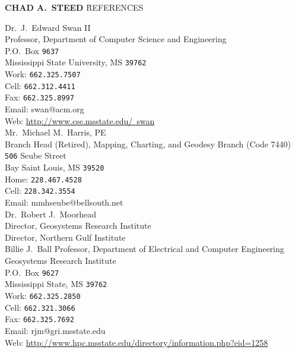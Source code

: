 \documentclass[11pt, a4paper]{article}
\begin{document}

\begin{tabbing}
    {\sffamily \LARGE \textbf{CHAD A.\ STEED}} \` {\sffamily \LARGE REFERENCES}
\end{tabbing}

Dr.~J.~Edward Swan II\\
Professor, Department of Computer Science and Engineering\\
P.O.~Box \texttt{9637}\\
Mississippi State University, MS  \texttt{39762}\\
Work: \texttt{662.325.7507}\\
Cell: \texttt{662.312.4411}\\
Fax: \texttt{662.325.8997}\\
Email: swan@acm.org\\
Web: \href{http://www.cse.msstate.edu/~swan}{http://www.cse.msstate.edu/~swan}\\

Mr.~Michael M.~Harris, PE\\
Branch Head (Retired), Mapping, Charting, and Geodesy Branch (Code 7440)\\
\texttt{506} Seube Street\\
Bay Saint Louis, MS  \texttt{39520}\\
Home: \texttt{228.467.4528}\\
Cell: \texttt{228.342.3554}\\
Email: mmhseube@bellsouth.net\\

Dr.~Robert J.~Moorhead\\
Director, Geosystems Research Institute\\
Director, Northern Gulf Institute\\
Billie J.~Ball Professor, Department of Electrical and Computer Engineering\\
Geosystems Research Institute\\
P.O.~Box \texttt{9627}\\
Mississippi State, MS  \texttt{39762}\\
Work: \texttt{662.325.2850}\\
Cell: \texttt{662.321.3066}\\
Fax: \texttt{662.325.7692}\\
Email: rjm@gri.msstate.edu\\
Web: \href{http://www.hpc.msstate.edu/directory/information.php?eid=1258}{http://www.hpc.msstate.edu/directory/information.php?eid=1258}\\
\end{document}
